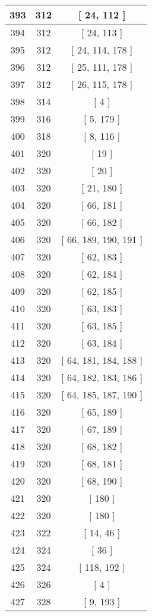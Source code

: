 \begin{center}
\begin{longtable}[H]{|| c c c ||}
\hline
393 & 312 & [ 24, 112 ] \\ 
\hline
394 & 312 & [ 24, 113 ] \\ 
\hline
395 & 312 & [ 24, 114, 178 ] \\ 
\hline
396 & 312 & [ 25, 111, 178 ] \\ 
\hline
397 & 312 & [ 26, 115, 178 ] \\ 
\hline
398 & 314 & [ 4 ] \\ 
\hline
399 & 316 & [ 5, 179 ] \\ 
\hline
400 & 318 & [ 8, 116 ] \\ 
\hline
401 & 320 & [ 19 ] \\ 
\hline
402 & 320 & [ 20 ] \\ 
\hline
403 & 320 & [ 21, 180 ] \\ 
\hline
404 & 320 & [ 66, 181 ] \\ 
\hline
405 & 320 & [ 66, 182 ] \\ 
\hline
406 & 320 & [ 66, 189, 190, 191 ] \\ 
\hline
407 & 320 & [ 62, 183 ] \\ 
\hline
408 & 320 & [ 62, 184 ] \\ 
\hline
409 & 320 & [ 62, 185 ] \\ 
\hline
410 & 320 & [ 63, 183 ] \\ 
\hline
411 & 320 & [ 63, 185 ] \\ 
\hline
412 & 320 & [ 63, 184 ] \\ 
\hline
413 & 320 & [ 64, 181, 184, 188 ] \\ 
\hline
414 & 320 & [ 64, 182, 183, 186 ] \\ 
\hline
415 & 320 & [ 64, 185, 187, 190 ] \\ 
\hline
416 & 320 & [ 65, 189 ] \\ 
\hline
417 & 320 & [ 67, 189 ] \\ 
\hline
418 & 320 & [ 68, 182 ] \\ 
\hline
419 & 320 & [ 68, 181 ] \\ 
\hline
420 & 320 & [ 68, 190 ] \\ 
\hline
421 & 320 & [ 180 ] \\ 
\hline
422 & 320 & [ 180 ] \\ 
\hline
423 & 322 & [ 14, 46 ] \\ 
\hline
424 & 324 & [ 36 ] \\ 
\hline
425 & 324 & [ 118, 192 ] \\ 
\hline
426 & 326 & [ 4 ] \\ 
\hline
427 & 328 & [ 9, 193 ] \\ 

\end{longtable}
\end{center}
